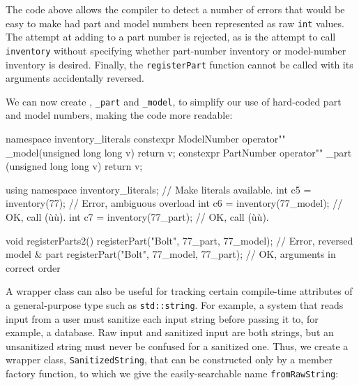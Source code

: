 \noindent The code above allows the compiler to detect a number of errors that
would be easy to make had part and model numbers been represented as raw
\lstinline!int! values. The attempt at adding to a part number is rejected,
as is the attempt to call \lstinline!inventory! without specifying whether
part-number inventory or model-number inventory is desired. Finally, the
\lstinline!registerPart! function cannot be called with its arguments
accidentally reversed.

We can now create , \lstinline!_part! and
\lstinline!_model!, to simplify our use of hard-coded part and model
numbers, making the code more readable:

\begin{emcppslisting}[emcppsbatch=e14]
namespace inventory_literals
{
    constexpr ModelNumber operator"" _model(unsigned long long v) { return v; }
    constexpr PartNumber  operator"" _part (unsigned long long v) { return v; }
}

using namespace inventory_literals;  // Make literals available.
int c5 = inventory(77);              // Error, ambiguous overload
int c6 = inventory(77_model);        // OK, call (ù{}ù).
int c7 = inventory(77_part);         // OK, call (ù{}ù).

void registerParts2()
{
    registerPart("Bolt", 77_part, 77_model); // Error, reversed model & part
    registerPart("Bolt", 77_model, 77_part); // OK, arguments in correct order
}
\end{emcppslisting}
    
\noindent A wrapper class can also be useful for tracking certain compile-time
attributes of a general-purpose type such as \lstinline!std::string!. For
example, a system that reads input from a user must sanitize each input
string before passing it to, for example, a database. Raw input and
sanitized input are both strings, but an unsanitized string must never
be confused for a sanitized one. Thus, we create a wrapper class,
\lstinline!SanitizedString!, that can be constructed only by a member
factory function, to which we give the easily-searchable name
\lstinline!fromRawString!:

